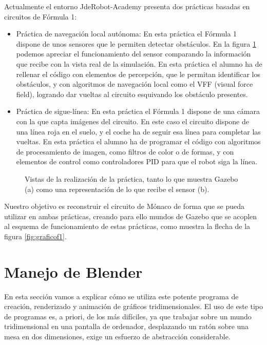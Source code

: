 Actualmente el entorno JdeRobot-Academy presenta dos prácticas basadas en circuitos de Fórmula 1:
\begin{itemize}
	\item Práctica de navegación local autónoma: En esta práctica el Fórmula 1 dispone de unos sensores que le permiten detectar obstáculos. En la figura \ref{fig:vff} podemos apreciar el funcionamiento del sensor comparando la información que recibe con la vista real de la simulación. En esta práctica el alumno ha de rellenar el código con elementos de percepción, que le permitan identificar los obstáculos, y con algoritmos de navegación local como el VFF (visual force field), logrando dar vueltas al circuito esquivando los obstáculo presentes.
	
	\item Práctica de sigue-línea: En esta práctica el Fórmula 1 dispone de una cámara con la que capta imágenes del circuito. En este caso el circuito dispone de una línea roja en el suelo, y el coche ha de seguir esa línea para completar las vueltas. En esta práctica el alumno ha de programar el código con algoritmos de procesamiento de imagen, como filtros de color o de formas, y con elementos de control como controladores PID para que el robot siga la línea.
\end{itemize}
	
\begin{figure}[h]
	\centering
	\caption[Vistas de la práctica de navegación local del F1.]{Vistas de la realización de la práctica, tanto lo que muestra Gazebo (a) como una representación de lo que recibe el sensor (b).} \label{fig:vff}
\end{figure}

Nuestro objetivo es reconstruir el circuito de Mónaco de forma que se pueda utilizar en ambas prácticas, creando para ello mundos de Gazebo que se acoplen al esquema de funcionamiento de estas prácticas, como muestra la flecha de la figura \ref{fig:graficof1}.

\section{Manejo de Blender}
\label{sec:circarr_manejodeblender}

En esta sección vamos a explicar cómo se utiliza este potente programa de creación, renderizado y animación de gráficos tridimensionales. El uso de este tipo de programas es, a priori, de los más difíciles, ya que trabajar sobre un mundo tridimensional en una pantalla de ordenador, desplazando un ratón sobre una mesa en dos dimensiones, exige un esfuerzo de abstracción considerable.


